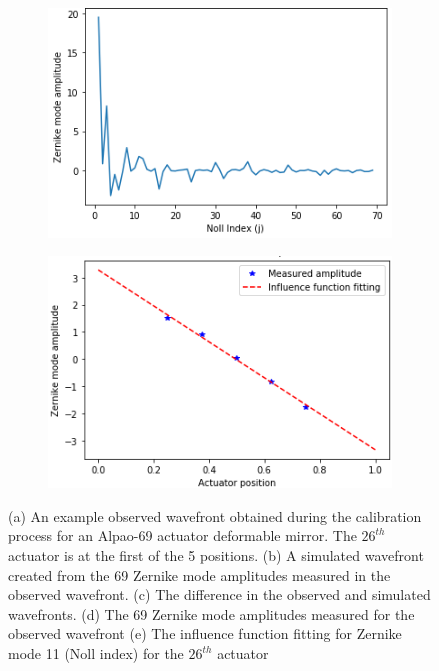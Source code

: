 \begin{figure}[h]
	\begin{subfigure}{0.45\textwidth}
		\centering
		\includegraphics[width=1\linewidth, scale=0.5]{images/measured_zernike_modes.png}
		\caption{}
		\label{fig:measured_zernike_modes}
	\end{subfigure}
	\begin{subfigure}{0.45\textwidth}
		\centering
		\includegraphics[width=1\linewidth, scale=0.5]{images/influence_function_11.png}
		\caption{}		
		\label{fig:influence_function_11}
	\end{subfigure}
	\caption{(a) An example observed wavefront obtained during the calibration process for an Alpao-69 actuator deformable mirror. The $26^{th}$ actuator is at the first of the 5 positions. (b) A simulated wavefront created from the 69 Zernike mode amplitudes measured in the observed wavefront. (c) The difference in the observed and simulated wavefronts. (d) The 69 Zernike mode amplitudes measured for the observed wavefront (e) The influence function fitting for Zernike mode 11 (Noll index) for the $26^{th}$ actuator}
	\label{fig:wavefront_decomposition}
\end{figure}

